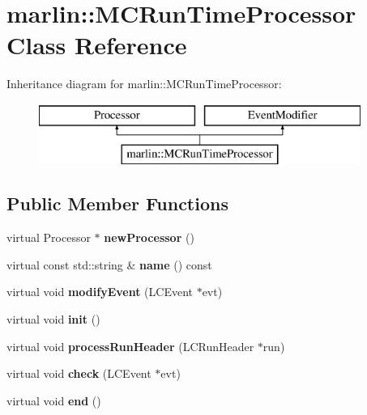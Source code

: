 \section{marlin\-:\-:M\-C\-Run\-Time\-Processor Class Reference}
\label{classmarlin_1_1MCRunTimeProcessor}
Inheritance diagram for marlin\-:\-:M\-C\-Run\-Time\-Processor\-:\begin{figure}[H]
\begin{center}
\leavevmode
\includegraphics[height=2.000000cm]{classmarlin_1_1MCRunTimeProcessor}
\end{center}
\end{figure}
\subsection*{Public Member Functions}
\begin{DoxyCompactItemize}
\item 
virtual Processor $\ast$ {\bfseries new\-Processor} ()\label{classmarlin_1_1MCRunTimeProcessor_afaa7a8f8af2e6d40734992523adb0f18}

\item 
virtual const std\-::string \& {\bfseries name} () const \label{classmarlin_1_1MCRunTimeProcessor_a594976d07353672f85e23f50bc2c0183}

\item 
virtual void {\bfseries modify\-Event} (L\-C\-Event $\ast$evt)\label{classmarlin_1_1MCRunTimeProcessor_a51c9d9bf4f8b66e2c3b82f31f0f26bba}

\item 
virtual void {\bfseries init} ()\label{classmarlin_1_1MCRunTimeProcessor_a645e036d00d0ac4f016a6fb8d33f40c1}

\item 
virtual void {\bfseries process\-Run\-Header} (L\-C\-Run\-Header $\ast$run)\label{classmarlin_1_1MCRunTimeProcessor_a94ffb5e4ec27a97de5a30bc5c43f0655}

\item 
virtual void {\bfseries check} (L\-C\-Event $\ast$evt)\label{classmarlin_1_1MCRunTimeProcessor_afcac2282e9028e447afc453cb0f3cc5d}

\item 
virtual void {\bfseries end} ()\label{classmarlin_1_1MCRunTimeProcessor_a1b72a2ae28eb11cf4460b765a0ef0e01}

\end{DoxyCompactItemize}
